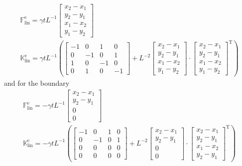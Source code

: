 \documentclass[a4paper,11pt]{article}
\newcommand{\uv}[1]{\mathds{#1}}
\newcommand{\um}[1]{\mathds{#1}}
\newcommand{\T}{\mathrm{T}}
\newcommand{\element}{\mathrm{e}}
\newcommand{\linear}{\mathrm{lin}}
\begin{document}
\begin{gather}
 \uv F^\element_\linear = \gamma t L^{-1} \begin{bmatrix}x_2-x_1\\y_2-y_1\\x_1-x_2\\y_1-y_2\end{bmatrix}\\
 \um K^\element_\linear = \gamma t L^{-1}\left(
	\begin{bmatrix}-1&0&1&0\\0&-1&0&1\\1&0&-1&0\\0&1&0&-1\end{bmatrix}+
	L^{-2}\begin{bmatrix}x_2-x_1\\y_2-y_1\\x_1-x_2\\y_1-y_2\end{bmatrix}\cdot\begin{bmatrix}x_2-x_1\\y_2-y_1\\x_1-x_2\\y_1-y_2\end{bmatrix}^\T
  \right)
\end{gather}
and for the boundary
\begin{gather}
 \uv F^\element_\linear = -\gamma t L^{-1} \begin{bmatrix}x_2-x_1\\y_2-y_1\\0\\0\end{bmatrix}\\
 \um K^\element_\linear = -\gamma t L^{-1} \left(\begin{bmatrix}-1&0&1&0\\0&-1&0&1\\0&0&0&0\\0&0&0&0\end{bmatrix} + L^{-2} \begin{bmatrix}x_2-x_1\\y_2-y_1\\0\\0\end{bmatrix}\cdot\begin{bmatrix}x_2-x_1\\y_2-y_1\\x_1-x_2\\y_2-y_1\end{bmatrix}^\T\right)\\
\end{gather}
\end{document}
